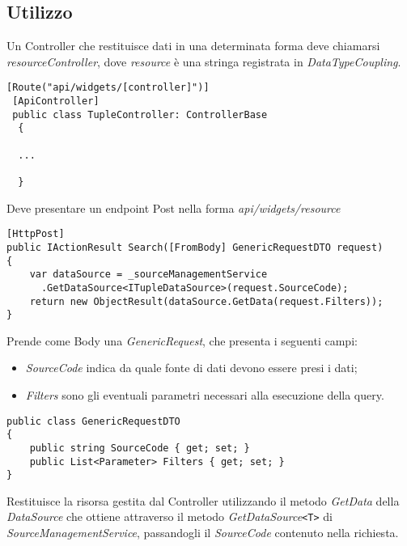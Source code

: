 \subsection{Utilizzo}
Un Controller che restituisce dati in una determinata forma deve chiamarsi \textit{{resource}Controller}, dove \textit{resource} è una stringa registrata in \textit{DataTypeCoupling}.
\begin{lstlisting}[caption={TupleController.cs}, style=sharpCode]
 [Route("api/widgets/[controller]")]
 [ApiController]
 public class TupleController: ControllerBase
  {
  
  ...
  
  }
\end{lstlisting}
Deve presentare un endpoint Post nella forma \textit{api/widgets/{resource}}
\begin{lstlisting}[caption={TupleController.cs, endpoint POST Search}, style=sharpCode]
[HttpPost]
public IActionResult Search([FromBody] GenericRequestDTO request)
{
    var dataSource = _sourceManagementService
      .GetDataSource<ITupleDataSource>(request.SourceCode);
    return new ObjectResult(dataSource.GetData(request.Filters));
}
\end{lstlisting}
Prende come Body una \textit{GenericRequest}, che presenta i seguenti campi:
\begin{itemize}
\item \textit{SourceCode} indica da quale fonte di dati devono essere presi i dati;
\item \textit{Filters} sono gli eventuali parametri necessari alla esecuzione della query.
\end{itemize}
\begin{lstlisting}[caption={GenericRequestDTO.cs}, style=sharpCode]
public class GenericRequestDTO
{
    public string SourceCode { get; set; }
    public List<Parameter> Filters { get; set; }
}
\end{lstlisting}
Restituisce la risorsa gestita dal Controller utilizzando il metodo \textit{GetData} della \textit{DataSource} che ottiene attraverso il metodo \textit{GetDataSource}\verb|<T>| di \textit{SourceManagementService}, passandogli il \textit{SourceCode} contenuto nella richiesta.